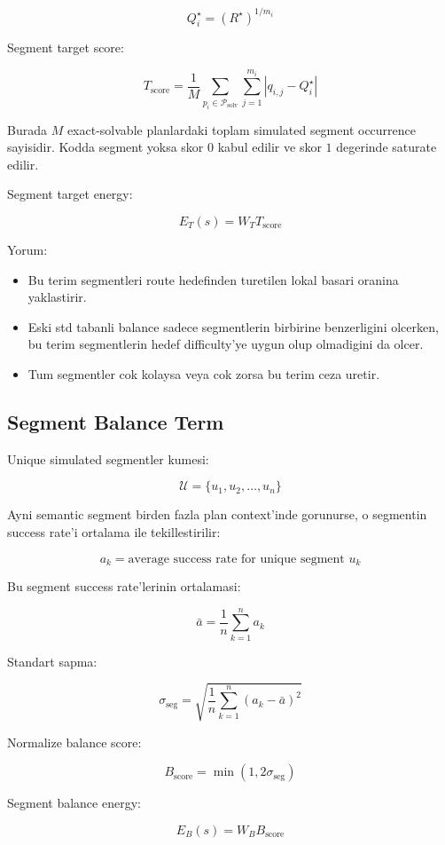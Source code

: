 \documentclass[11pt]{article}
\begin{document}
\[
Q_i^\star
=
(R^\star)^{1/m_i}
\]

Segment target score:

\[
T_{\text{score}}
=
\frac{1}{M}
\sum_{p_i \in \mathcal{P}_{\text{solv}}}
\sum_{j=1}^{m_i}
\left|
q_{i,j} - Q_i^\star
\right|
\]

Burada $M$ exact-solvable planlardaki toplam simulated segment occurrence sayisidir.
Kodda segment yoksa skor $0$ kabul edilir ve skor $1$ degerinde saturate edilir.

Segment target energy:

\[
E_T(s)
=
W_T T_{\text{score}}
\]

Yorum:

\begin{itemize}
  \item Bu terim segmentleri route hedefinden turetilen lokal basari oranina yaklastirir.
  \item Eski std tabanli balance sadece segmentlerin birbirine benzerligini olcerken, bu terim segmentlerin hedef difficulty'ye uygun olup olmadigini da olcer.
  \item Tum segmentler cok kolaysa veya cok zorsa bu terim ceza uretir.
\end{itemize}

\subsection{Segment Balance Term}

Unique simulated segmentler kumesi:

\[
\mathcal{U}
=
\{u_1, u_2, \ldots, u_n\}
\]

Ayni semantic segment birden fazla plan context'inde gorunurse, o segmentin success rate'i ortalama ile tekillestirilir:

\[
a_k
=
\text{average success rate for unique segment } u_k
\]

Bu segment success rate'lerinin ortalamasi:

\[
\bar{a}
=
\frac{1}{n}
\sum_{k=1}^{n} a_k
\]

Standart sapma:

\[
\sigma_{\text{seg}}
=
\sqrt{
  \frac{1}{n}
  \sum_{k=1}^{n}
  (a_k - \bar{a})^2
}
\]

Normalize balance score:

\[
B_{\text{score}}
=
\min(1, 2\sigma_{\text{seg}})
\]

Segment balance energy:

\[
E_B(s)
=
W_B B_{\text{score}}
\]
\end{document}

